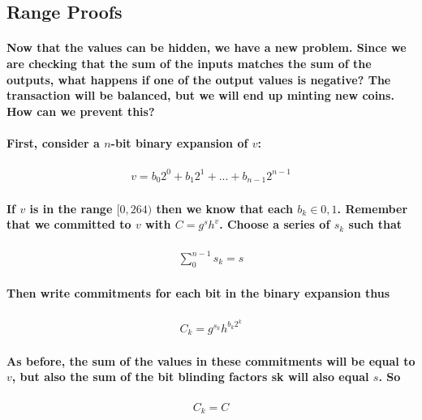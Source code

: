 \documentclass{article}
\begin{document}
\subsection{Range Proofs}

\paragraph{Now that the values can be hidden, we have a new problem.  Since we are checking that the sum of the inputs matches the sum of the outputs, what happens if one of the output values is negative?  The transaction will be balanced, but we will end up minting new coins.  How can we prevent this?}

\paragraph{First, consider a $n$-bit binary expansion of $v$:}

\begin{eqnarray}
  v = b_0 2^0 + b_1 2^1 + ... + b_{n-1} 2^{n-1}
\end{eqnarray}

\paragraph{If $v$ is in the range $[0, 264)$ then we know that each $b_k \in {0, 1}$.  Remember that we committed to $v$ with $C = g^s h^v$.  Choose a series of $s_k$ such that}

\begin{eqnarray}
  \sum_0^{n-1} s_k = s 
\end{eqnarray}

\paragraph{Then write commitments for each bit in the binary expansion thus}

\begin{eqnarray}
  C_k = g^{s_k} h^{b_k 2^k}
\end{eqnarray}

\paragraph{As before, the sum of the values in these commitments will be equal to $v$, but also the sum of the bit blinding factors sk will also equal $s$.  So}

\begin{eqnarray}
  C_k = C
\end{eqnarray}
\end{document}
